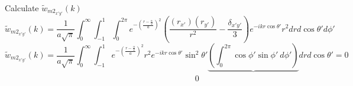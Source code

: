\documentclass[letterpaper,twocolumn,amsmath,amssymb,prb]{revtex4-1}
\begin{document}
\begin{widetext}
Calculate $\widetilde{w}_{{m2}_{x'y'}}(k)$ 
\begin{equation}{\widetilde{w}_{{m2}_{x'y'}}(k)=\frac{1}{a\sqrt{\pi}}\int_{0}^{\infty}\int_{-1}^{1}\int_{0}^{2\pi}e^{-\left(\frac{r-\frac{\alpha}{2}}{a}\right)^2}\left(\frac{(r_{x'})(r_{y'})}{r^2}-\frac{\delta_{x'y'}}{3}\right)e^{-ikr\cos\theta'}r^2d{r}d{\cos\theta'}d{\phi'}}\end{equation}
\begin{equation}{\widetilde{w}_{{m2}_{x'y'}}(k)=\frac{1}{a\sqrt{\pi}}\int_{0}^{\infty}\int_{-1}^{1}e^{-\left(\frac{r-\frac{\alpha}{2}}{a}\right)^2}r^2e^{-ikr\cos\theta'}\sin^2\theta'\underbrace{\left(\int_{0}^{2\pi}\cos\phi'\sin{\phi'}~d{\phi'}\right)}d{r}d{\cos\theta'}=0}\end{equation}
$~~~~~~~~~~~~~~~~~~~~~~~~~~~~~~~~~~~~~~~~~~~~~~~~~~~~~~~~~~~~~~~~~~~~~~~~~~~~~~~~~~~~~~~~~~~~~~~~~~~~~~~~0$


\end{widetext}
\end{document}
